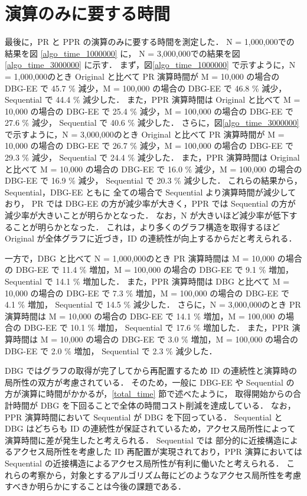 \section{演算のみに要する時間}
\label{algo_time}
最後に，PR と PPR の演算のみに要する時間を測定した．
N = 1,000,000での結果を図 \ref{algo_time_1000000} に，
N = 3,000,000での結果を図 \ref{algo_time_3000000} に示す．
まず，図\ref{algo_time_1000000} で示すように，N = 1,000,000のとき Original と比べて PR 演算時間が M = 10,000 の場合の DBG-EE で 45.7 \% 減少，M = 100,000 の場合の DBG-EE で 46.8 \% 減少， 
Sequential で 44.4 \% 減少した． 
また，PPR 演算時間は Original と比べて M = 10,000 の場合の DBG-EE で 25.4 \% 減少，M = 100,000 の場合の DBG-EE で 27.6 \% 減少， 
Sequential で 40.6 \% 減少した．
さらに，図\ref{algo_time_3000000} で示すように，N = 3,000,000のとき Original と比べて PR 演算時間が M = 10,000 の場合の DBG-EE で 26.7 \% 減少，M = 100,000 の場合の DBG-EE で 29.3 \% 減少， 
Sequential で 24.4 \% 減少した．
また，PPR 演算時間は Original と比べて M = 10,000 の場合の DBG-EE で 16.0 \% 減少，M = 100,000 の場合の DBG-EE で 16.9 \% 減少， 
Sequential で 20.3 \% 減少した．
これらの結果から，Sequential，DBG-EE ともに 全ての場合で Sequential より演算時間が減少しており，
PR では DBG-EE の方が減少率が大きく，PPR では Sequential の方が減少率が大きいことが明らかとなった．
なお，N が大きいほど減少率が低下することが明らかとなった．
これは，より多くのグラフ構造を取得するほど Original が全体グラフに近づき，ID の連続性が向上するからだと考えられる．

一方で，DBG と比べて N = 1,000,000のとき PR 演算時間は M = 10,000 の場合の DBG-EE で 11.4 \% 増加，M = 100,000 の場合の DBG-EE で 9.1 \% 増加， 
Sequential で 14.1 \% 増加した．
また，PPR 演算時間は DBG と比べて M = 10,000 の場合の DBG-EE で 7.3 \% 増加，M = 100,000 の場合の DBG-EE で 4.1 \% 増加， 
Sequential で 14.5 \% 減少した．
さらに，N = 3,000,000のとき PR 演算時間は M = 10,000 の場合の DBG-EE で 14.1 \% 増加，M = 100,000 の場合の DBG-EE で 10.1 \% 増加， 
Sequential で 17.6 \% 増加した．
また，PPR 演算時間は M = 10,000 の場合の DBG-EE で 3.0 \% 増加，M = 100,000 の場合の DBG-EE で 2.0 \% 増加， 
Sequential で 2.3 \% 減少した．

DBG ではグラフの取得が完了してから再配置するため ID の連続性と演算時の局所性の双方が考慮されている．
そのため，一般に DBG-EE や Sequential の方が演算に時間がかかるが，\ref{total_time} 節で述べたように，
取得開始からの合計時間が DBG を下回ることで全体の時間コスト削減を達成している．
なお，PPR 演算時間において Sequential が DBG を下回っている．
Sequential と DBG はどちらも ID の連続性が保証されているため，アクセス局所性によって演算時間に差が発生したと考えられる．
Sequential では 部分的に近接構造によるアクセス局所性を考慮した ID 再配置が実現されており，PPR 演算においては Sequential の近接構造によるアクセス局所性が有利に働いたと考えられる．
これらの考察から，対象とするアルゴリズム毎にどのようなアクセス局所性を考慮すべきか明らかにすることは今後の課題である．

